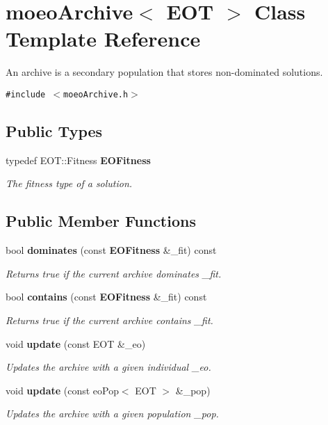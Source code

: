 \section{moeo\-Archive$<$ EOT $>$ Class Template Reference}
\label{classmoeoArchive}
An archive is a secondary population that stores non-dominated solutions.  


{\tt \#include $<$moeo\-Archive.h$>$}

\subsection*{Public Types}
\begin{CompactItemize}
\item 
typedef EOT::Fitness {\bf EOFitness}\label{classmoeoArchive_798bc97d8321b1e2c469e5c341a96dac}

\begin{CompactList}\small\item\em The fitness type of a solution. \item\end{CompactList}\end{CompactItemize}
\subsection*{Public Member Functions}
\begin{CompactItemize}
\item 
bool {\bf dominates} (const {\bf EOFitness} \&\_\-fit) const
\begin{CompactList}\small\item\em Returns true if the current archive dominates \_\-fit. \item\end{CompactList}\item 
bool {\bf contains} (const {\bf EOFitness} \&\_\-fit) const
\begin{CompactList}\small\item\em Returns true if the current archive contains \_\-fit. \item\end{CompactList}\item 
void {\bf update} (const EOT \&\_\-eo)
\begin{CompactList}\small\item\em Updates the archive with a given individual \_\-eo. \item\end{CompactList}\item 
void {\bf update} (const eo\-Pop$<$ EOT $>$ \&\_\-pop)
\begin{CompactList}\small\item\em Updates the archive with a given population \_\-pop. \item\end{CompactList}\end{CompactItemize}


